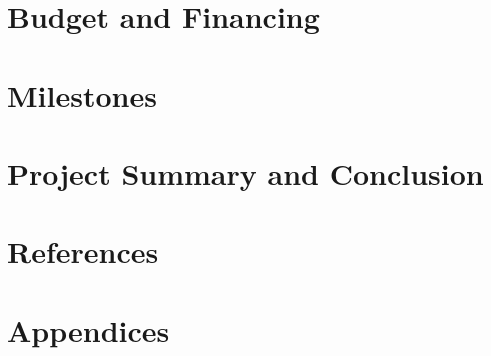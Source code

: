 \documentclass[12pt]{article}
\begin{document}
\section{Budget and Financing}
  
\newpage

\section{Milestones}
  
\newpage

\section{Project Summary and Conclusion}
  
\newpage

\section{References}
  
\newpage

\section{Appendices}
  
\end{document}
